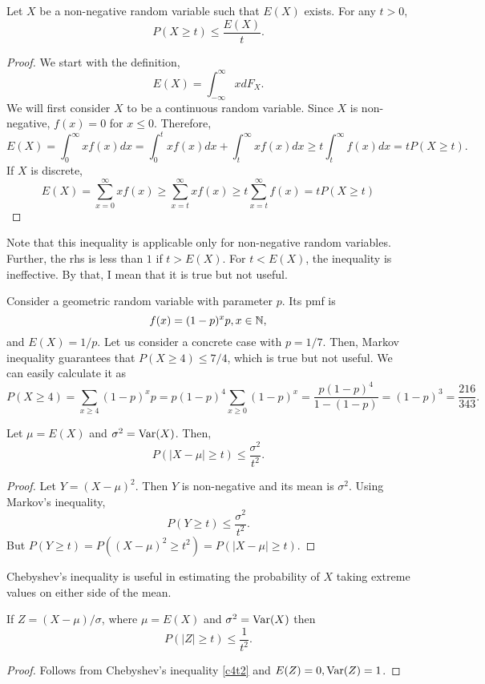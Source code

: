 \documentclass{article}
\begin{document}
\begin{thm}\label{c4t1}
Let $X$ be a non-negative random variable such that $E(X)$ exists. For any 
$t>0$,
\[
P(X \ge t) \le \frac{E(X)}{t}.
\]
\end{thm}
\begin{proof}
We start with the definition,
\[
E(X) = \int_{-\infty}^\infty xdF_X.
\]
We will first consider $X$ to be a continuous random variable. Since $X$ is 
non-negative, $f(x) = 0$ for $x \le 0$. Therefore,
\[
E(X) = \int_0^\infty xf(x)dx = \int_0^t xf(x)dx + \int_t^\infty xf(x)dx \ge
t\int_t^\infty f(x)dx = tP(X \ge t).
\]
If $X$ is discrete,
\[
E(X) = \sum_{x=0}^\infty xf(x) \ge \sum_{x=t}^\infty xf(x) \ge 
t\sum_{x=t}^\infty f(x) = tP(X \ge t)
\]
\end{proof}
\begin{rem}
Note that this inequality is applicable only for non-negative random variables.
Further, the rhs is less than $1$ if $t > E(X)$. For $t < E(X)$, the inequality
is ineffective. By that, I mean that it is true but not useful.
\end{rem}

Consider a geometric random variable with parameter $p$. Its pmf is
\[
f(x) = (1 - p)^x p, x \in \mathbb{N},
\]
and $E(X) = 1/p$. Let us consider a concrete case with $p = 1/7$. Then, Markov
inequality guarantees that $P(X \ge 4) \le 7/4$, which is true but not useful.
We can easily calculate it as
\[
P(X \ge 4) = \sum_{x \ge 4}(1 - p)^x p = p(1-p)^4 \sum_{x\ge 0}(1-p)^x = 
\frac{p(1-p)^4}{1 - (1 - p)} = (1 - p)^3 = \frac{216}{343}.
\]

\begin{thm}\label{c4t2}
Let $\mu = E(X)$ and $\sigma^2 = \operatorname{Var}(X)$. Then,
\[
P(|X - \mu| \ge t) \le \frac{\sigma^2}{t^2}.
\]
\end{thm}
\begin{proof}
Let $Y = (X - \mu)^2$. Then $Y$ is non-negative and its mean is $\sigma^2$. 
Using Markov's inequality,
\[
P(Y \ge t) \le \frac{\sigma^2}{t^2}.
\]
But $P(Y \ge t) = P((X - \mu)^2 \ge t^2) = P(|X - \mu| \ge t)$.
\end{proof}
\begin{rem}
Chebyshev's inequality is useful in estimating the probability of $X$ taking
extreme values on either side of the mean.
\end{rem}

\begin{cor}\label{c4c1}
If $Z = (X - \mu)/\sigma$, where $\mu = E(X)$ and $\sigma^2 = \operatorname{Var}(X)$ then
\[
P(|Z| \ge t) \le \frac{1}{t^2}.
\]
\end{cor}
\begin{proof}
Follows from Chebyshev's inequality \ref{c4t2} and $E(Z) = 0, \operatorname{Var}(Z) = 1$.
\end{proof}
\end{document}
